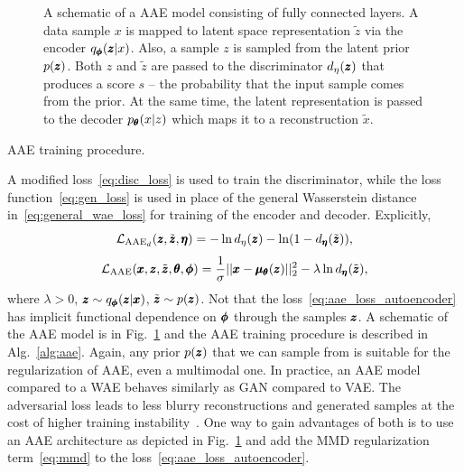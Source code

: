 \begin{figure}
\centering{}\caption{A schematic of a AAE model consisting of fully connected layers. A data sample $x$ is mapped to latent space representation $\tilde{z}$ via the encoder $q_{\pmb{{\phi}}}(\pmb{{z}}|x)$. Also, a sample $z$ is sampled from the latent prior $p(\pmb{{z}})$. Both $z$ and $\tilde{z}$ are passed to the discriminator $d_{\eta}(\pmb{{z}})$ that produces a score $s$ -- the probability that the input sample comes from the prior. At the same time, the latent representation is passed to the decoder $p_{\pmb{{\theta}}}(x|z)$ which maps it to a reconstruction $\tilde{x}$.}
\label{fig:aae}
\end{figure}

\begin{algorithm}

\caption{AAE training procedure.}
\label{alg:aae}
\end{algorithm}

A modified loss~\eqref{eq:disc_loss} is used to train the discriminator, while the loss function~\eqref{eq:gen_loss} is used in place of the general Wasserstein distance in~\eqref{eq:general_wae_loss} for training of the encoder and decoder. Explicitly,
\begin{equation} \label{eq:aae_loss_disc}
\mathcal{L}_{\text{AAE}_d}(\pmb{{z}},\tilde{\pmb{{z}}}, \pmb{{\eta}})= - \ln d_{\eta}(\pmb{{z}}) - \ln(1-d_{\pmb{{\eta}}}(\tilde{\pmb{{z}}})),
\end{equation}
\begin{equation} \label{eq:aae_loss_autoencoder}
\mathcal{L}_{\text{AAE}}(\pmb{{x}},\pmb{{z}},\tilde{\pmb{{z}}}, \pmb{{\theta}}, \pmb{{\phi}}) = \frac{1}{\sigma}||\pmb{{x}}-\pmb{{\mu}}_{\pmb{{\theta}}}(\pmb{{z}})||_{2}^{2} -\lambda\ln d_{\pmb{{\eta}}}(\tilde{\pmb{{z}}}),
\end{equation}
where $\lambda>0$, $\pmb{{z}} \sim q_{\pmb{{\phi}}}(\pmb{{z}}|\pmb{{x}})$, $\tilde{\pmb{{z}}} \sim p(\pmb{{z}})$. Not that the loss~\eqref{eq:aae_loss_autoencoder} has implicit functional dependence on $\pmb{{\phi}}$ through the samples $\pmb{{z}}$.  A schematic of the AAE model is in Fig.~\ref{fig:aae} and the AAE training procedure is described in Alg.~\ref{alg:aae}. Again, any prior $p(\pmb{{z}})$ that we can sample from is suitable for the regularization of AAE, even a multimodal one. In practice, an AAE model compared to a WAE behaves similarly as GAN compared to VAE. The adversarial loss leads to less blurry reconstructions and generated samples at the cost of higher training instability~\cite{tolstikhin2017wasserstein}. One way to gain advantages of both is to use an AAE architecture as depicted in Fig.~\ref{fig:aae} and add the MMD regularization term~\eqref{eq:mmd} to the loss~\eqref{eq:aae_loss_autoencoder}.

